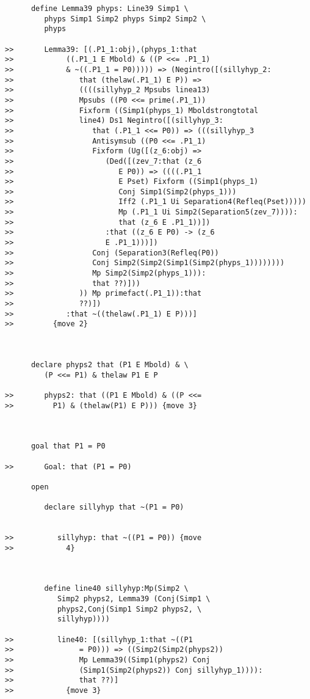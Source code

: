 \documentclass[12pt]{article}
\begin{document}
\begin{verbatim}
      define Lemma39 phyps: Line39 Simp1 \
         phyps Simp1 Simp2 phyps Simp2 Simp2 \
         phyps

>>       Lemma39: [(.P1_1:obj),(phyps_1:that
>>            ((.P1_1 E Mbold) & ((P <<= .P1_1)
>>            & ~((.P1_1 = P0))))) => (Negintro([(sillyhyp_2:
>>               that (thelaw(.P1_1) E P)) =>
>>               ((((sillyhyp_2 Mpsubs linea13)
>>               Mpsubs ((P0 <<= prime(.P1_1))
>>               Fixform ((Simp1(phyps_1) Mboldstrongtotal
>>               line4) Ds1 Negintro([(sillyhyp_3:
>>                  that (.P1_1 <<= P0)) => (((sillyhyp_3
>>                  Antisymsub ((P0 <<= .P1_1)
>>                  Fixform (Ug([(z_6:obj) =>
>>                     (Ded([(zev_7:that (z_6
>>                        E P0)) => ((((.P1_1
>>                        E Pset) Fixform ((Simp1(phyps_1)
>>                        Conj Simp1(Simp2(phyps_1)))
>>                        Iff2 (.P1_1 Ui Separation4(Refleq(Pset)))))
>>                        Mp (.P1_1 Ui Simp2(Separation5(zev_7)))):
>>                        that (z_6 E .P1_1))])
>>                     :that ((z_6 E P0) -> (z_6
>>                     E .P1_1)))])
>>                  Conj (Separation3(Refleq(P0))
>>                  Conj Simp2(Simp2(Simp1(Simp2(phyps_1))))))))
>>                  Mp Simp2(Simp2(phyps_1))):
>>                  that ??)]))
>>               )) Mp primefact(.P1_1)):that
>>               ??)])
>>            :that ~((thelaw(.P1_1) E P)))]
>>         {move 2}



      declare phyps2 that (P1 E Mbold) & \
         (P <<= P1) & thelaw P1 E P

>>       phyps2: that ((P1 E Mbold) & ((P <<=
>>         P1) & (thelaw(P1) E P))) {move 3}



      goal that P1 = P0

>>       Goal: that (P1 = P0)

      open

         declare sillyhyp that ~(P1 = P0)


>>          sillyhyp: that ~((P1 = P0)) {move
>>            4}



         define line40 sillyhyp:Mp(Simp2 \
            Simp2 phyps2, Lemma39 (Conj(Simp1 \
            phyps2,Conj(Simp1 Simp2 phyps2, \
            sillyhyp))))

>>          line40: [(sillyhyp_1:that ~((P1
>>               = P0))) => ((Simp2(Simp2(phyps2))
>>               Mp Lemma39((Simp1(phyps2) Conj
>>               (Simp1(Simp2(phyps2)) Conj sillyhyp_1)))):
>>               that ??)]
>>            {move 3}




\end{verbatim}
\end{document}
